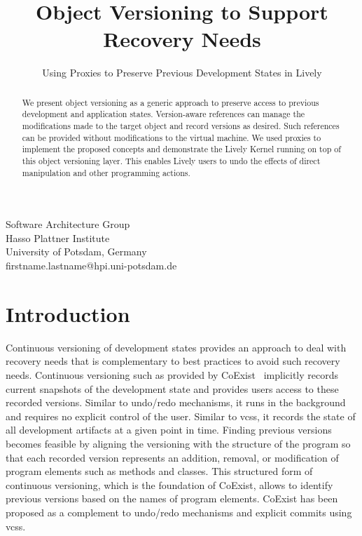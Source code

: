 \documentclass{sigplanconf}
\newcommand{\coexist}{CoExist\xspace}
\newcommand{\acp}[1]{\glspl{#1}}
\begin{document}
\exclusivelicense
{}

\title{Object Versioning to Support Recovery Needs} 
\subtitle{Using Proxies to Preserve Previous Development States in Lively}

           {Software Architecture Group\\ Hasso Plattner Institute\\ University of Potsdam, Germany\\}
           {firstname.lastname@hpi.uni-potsdam.de}

\maketitle


\begin{abstract}
  We present object versioning as a generic approach to preserve
  access to previous development and application states. Version-aware
  references can manage the modifications made to the target object
  and record versions as desired. Such references can be provided
  without modifications to the virtual machine. We used proxies to
  implement the proposed concepts and demonstrate the Lively Kernel
  running on top of this object versioning layer. This enables Lively
  users to undo the effects of direct manipulation and other programming
  actions.
\end{abstract}

\section{Introduction} 
\label{sec:INTRODUCTION}

Continuous versioning of development states provides an approach to
deal with recovery needs that is complementary to best practices to
avoid such recovery needs. Continuous versioning such as
provided by \coexist~\cite{Steinert2012COE} implicitly records
current snapshots of the development state and provides users access
to these recorded versions. Similar to undo/redo mechanisms, it runs
in the background and requires no explicit control of the
user. Similar to \acp{vcs}, it records the state of all development
artifacts at a given point in time. Finding previous versions becomes
feasible by aligning the versioning with the structure of the program
so that each recorded version represents an addition, removal, or
modification of program elements such as methods and classes. This
structured form of continuous versioning, which is the foundation of
\coexist, allows to identify previous versions based on the names of
program elements. \coexist has been proposed as a complement to
undo/redo mechanisms and explicit commits using \acp{vcs}.
\end{document}
